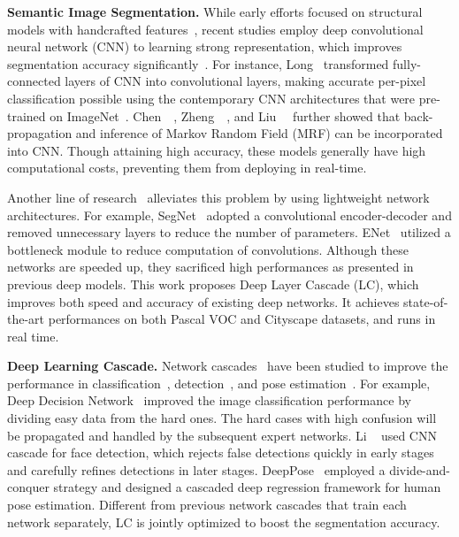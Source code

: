 \documentclass[10pt,twocolumn,letterpaper]{article}
\begin{document}
\noindent
\textbf{Semantic Image Segmentation.}
While early efforts focused on structural models with handcrafted features~\cite{kae2013augmenting, koltun2011efficient, vineet2012filter, yang2014context}, recent studies employ deep convolutional neural network (CNN) to learning strong representation, which improves segmentation accuracy significantly~\cite{chen2014semantic,liu2015semantic,liu2016deep,long2014fully,zheng2015conditional}.
For instance, Long~\etal \cite{long2014fully} transformed fully-connected layers of CNN into convolutional layers, making accurate per-pixel classification possible using the contemporary CNN architectures that were pre-trained on ImageNet~\cite{deng2009imagenet}.
Chen~\etal~\cite{chen2014semantic}, Zheng~\etal~\cite{zheng2015conditional}, and Liu~\etal~\cite{liu2015semantic,liu2016deep} further showed that back-propagation and inference of Markov Random Field (MRF) can be incorporated into CNN.
Though attaining high accuracy, these models generally have high computational costs, preventing them from deploying in real-time.

Another line of research~\cite{badrinarayanan2015segnet, liu2016learning, paszke2016enet} alleviates this problem by using lightweight network architectures.
For example, SegNet~\cite{badrinarayanan2015segnet} adopted a convolutional encoder-decoder and removed unnecessary layers to reduce the number of parameters.
ENet~\cite{paszke2016enet} utilized a bottleneck module to reduce computation of convolutions.
Although these networks are speeded up, they sacrificed high performances as presented in previous deep models.
This work proposes Deep Layer Cascade (LC), which improves both speed and accuracy of existing deep networks.
It achieves state-of-the-art performances on both Pascal VOC and Cityscape datasets, and runs in real time.

\noindent
\textbf{Deep Learning Cascade.}
Network cascades~\cite{cai2015learning, li2015convolutional, murthy2016deep, toshev2014deeppose, liu2016fashion} have been studied to improve the performance in classification~\cite{murthy2016deep}, detection~\cite{li2015convolutional}, and pose estimation~\cite{toshev2014deeppose}.
For example, Deep Decision Network~\cite{murthy2016deep} improved the image classification performance by dividing easy data from the hard ones.
The hard cases with high confusion will be propagated and handled by the subsequent expert networks.
Li \etal~\cite{li2015convolutional} used CNN cascade for face detection, which rejects false detections quickly in early stages and carefully refines detections in later stages.
DeepPose~\cite{toshev2014deeppose} employed a divide-and-conquer strategy and designed a cascaded deep regression framework for human pose estimation.
Different from previous network cascades that train each network separately,  
LC is jointly optimized to boost the segmentation accuracy.
 
\end{document}
